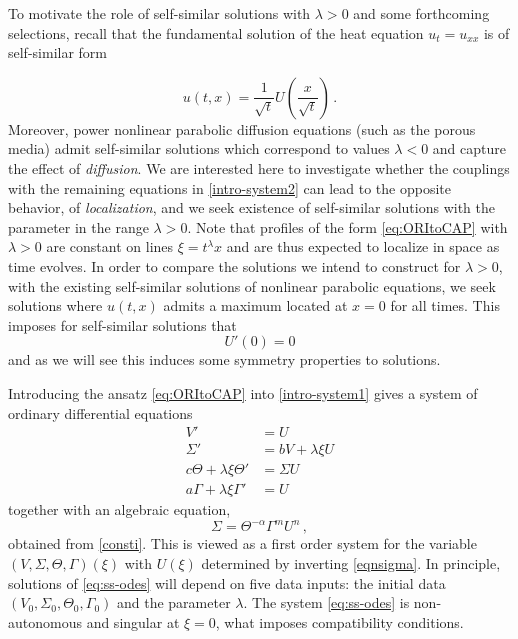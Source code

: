 \documentclass[11pt]{article}
\newcommand{\tcb}{}
\theoremstyle{remark}
\begin{document}
\tcb{
To motivate the role of self-similar solutions with $\lambda>0$ and some forthcoming selections,
recall that the fundamental solution of the
heat equation $u_t = u_{xx}$ is of self-similar form

$$
u(t, x) = \frac{1}{\sqrt{t}}U ( \frac{x}{\sqrt{t}} )\, .
$$
Moreover, power nonlinear parabolic diffusion equations (such as the porous media) admit self-similar solutions
which correspond to values $\lambda < 0$ and capture the effect of {\it diffusion}.
We are interested here to investigate whether the couplings with the remaining equations in \eqref{intro-system2}
can lead to the opposite behavior, of {\it localization}, and we seek existence of self-similar solutions
with the parameter in the range $\lambda>0$.
Note that profiles of the form \eqref{eq:ORItoCAP} with $\lambda > 0$ are constant on lines $\xi = t^\lambda x$  and are thus expected
to localize in space as time evolves. In order to compare the solutions we intend to construct for $\lambda > 0$,
with the existing self-similar solutions  of nonlinear parabolic equations,
we seek solutions where  $u(t,x)$ admits a maximum located at $x = 0$ for all times.
This imposes for self-similar solutions that
\begin{equation}
\label{bc1}
U'(0) = 0
\end{equation}
and as we will see this induces some symmetry properties to solutions.

Introducing the ansatz \eqref{eq:ORItoCAP} into \eqref{intro-system1}
gives a system of ordinary differential equations
\begin{equation}
\label{eq:ss-odes}
\begin{aligned}
V' &= U
\\
\Sigma' &= b V + \lambda \xi U
\\
 c \Theta + \lambda \xi \Theta' &=\Sigma U
 \\
a \Gamma + \lambda \xi \Gamma'  &= U
\end{aligned}
\end{equation}
together with an algebraic equation,
 \begin{equation}
\label{eqnsigma}
 \Sigma = \Theta^{-\alpha} \Gamma^m U^n \, ,
\end{equation}
obtained from \eqref{consti}.
This is viewed as a first order system for the variable $(V , \Sigma, \Theta , \Gamma)(\xi)$ with
 $U(\xi)$  determined by  inverting \eqref{eqnsigma}.
In principle, solutions
of \eqref{eq:ss-odes} will depend on five data inputs:  the initial data $(V_0, \Sigma_0, \Theta_0, \Gamma_0)$ and the
parameter $\lambda$.
The system \eqref{eq:ss-odes} is non-autonomous and singular at $\xi = 0$, what  imposes compatibility conditions.

}
\end{document}
